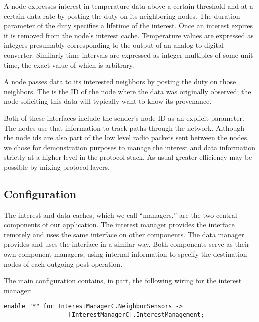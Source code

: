 A node expresses interest in temperature data above a certain threshold
and at a certain data rate by posting the  duty on
its neighboring nodes. The duration parameter of the
 duty specifies a lifetime of the interest. Once an
interest expires it is removed from the node's interest cache.
Temperature values are expressed as integers presumably corresponding to
the output of an analog to digital converter. Similarly time intervals
are expressed as integer multiples of some unit time, the exact value of
which is arbitrary.

A node passes data to its interested neighbors by posting the
 duty on those neighbors. The  is
the ID of the node where the data was originally observed; the node
soliciting this data will typically want to know its provenance.

Both of these interfaces include the sender's node ID as an explicit
parameter. The nodes use that information to track paths through the
network. Although the node ids are also part of the low level radio
packets sent between the nodes, we chose for demonstration purposes to
manage the interest and data information strictly at a higher level in
the protocol stack. As usual greater efficiency may be possible by
mixing protocol layers.

\subsection{Configuration}

The interest and data caches, which we call ``managers,'' are the two
central components of our application. The interest manager provides the
 interface remotely and uses the same
interface on other components. The data manager provides and uses the
 interface in a similar way. Both components
serve as their own component managers, using internal information to
specify the destination nodes of each outgoing post operation.

The main configuration contains, in part, the following wiring for the
interest manager:

\begin{lrbox}{\savebigbox}
\begin{minipage}{4.5in}
\vspace{0.6em}
\begin{Verbatim}[fontsize=\small]
enable "*" for InterestManagerC.NeighborSensors ->
                  [InterestManagerC].InterestManagement;
\end{Verbatim}
\vspace{0.3em}
\end{minipage}
\end{lrbox}
\centerline{\usebox{\savebigbox}}

